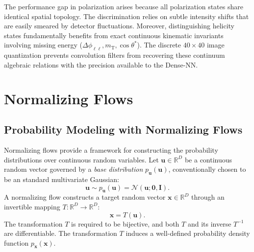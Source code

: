 \documentclass[12pt]{article}
\renewcommand{\vec}[1]{\boldsymbol{\mathbf{#1}}}
\begin{document}
        The performance gap in polarization arises because all polarization states share identical spatial topology. The discrimination relies on subtle intensity shifts that are easily smeared by detector fluctuations. Moreover, distinguishing helicity states fundamentally benefits from exact continuous kinematic invariants involving missing energy ($\Delta\phi_{\ell\ell}, m_{\text{T}}, \cos\theta^*$). The discrete $40 \times 40$ image quantization prevents convolution filters from recovering these continuum algebraic relations with the precision available to the Dense-NN.



\section{Normalizing Flows}%
\label{sec:normalizing_flows}

    \subsection{Probability Modeling with Normalizing Flows}%
    \label{sub:probability_modeling_with_normalizing_flows}

        Normalizing flows provide a framework for constructing the probability distributions over continuous random variables. Let $\vec{u} \in \mathbb{R}^D$ be a continuous random vector governed by a \textit{base distribution} $p_{\vec{u}}(\vec{u})$, conventionally chosen to be an standard multivariate Gaussian:
        \begin{equation*}
            \vec{u} \sim p_{\vec{u}}(\vec{u}) = \mathcal{N}(\vec{u}; \vec{0}, \mathbf{I}).
        \end{equation*}
        A normalizing flow constructs a target random vector $\vec{x} \in \mathbb{R}^D$ through an invertible mapping $T: \mathbb{R}^D \to \mathbb{R}^D$:
        \begin{equation}
            \vec{x} = T(\vec{u}).
        \end{equation}
        The transformation $T$ is required to be bijective, and both $T$ and its inverse $T^{-1}$ are differentiable. The transformation $T$ induces a well-defined probability density function $p_{\vec{x}}(\vec{x})$.
\end{document}

